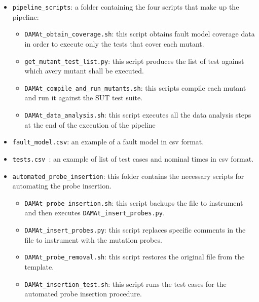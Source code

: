 \begin{itemize}
{\begin{itemize}
\begin{itemize}
\begin{itemize}
			\item \texttt{get\_operator\_coverage.py}: this script analizes the results of the operator coverage.
			\item \texttt{get\_stats.py}: this script produces statistics from the mutants' execution.
			\item \texttt{get\_final\_results.py}: this script produces a summary of the execution of \DAMA.
		\end{itemize}%
		\item \texttt{pipeline\_scripts}: a folder containing the four scripts that make up the \DAMA pipeline:
		\begin{itemize}%
			\item \texttt{DAMAt\_obtain\_coverage.sh}: this script obtains fault model coverage data in order to execute only the tests that cover each mutant.
			\item \texttt{get\_mutant\_test\_list.py}: this script produces the list of test against which avery mutant shall be executed.
			\item \texttt{DAMAt\_compile\_and\_run\_mutants.sh}: this scripts compile each mutant and run it against the SUT test suite.
			\item \texttt{DAMAt\_data\_analysis.sh}: this script executes all the data analysis steps at the end of the execution of the \DAMA pipeline
		\end{itemize}%
		\item \texttt{fault\_model.csv}: an example of a \DAMA fault model in csv format.
		\item \texttt{tests.csv }: an example of list of test cases and nominal times in csv format.
		\STARTCHANGEDFR
		\item \texttt{automated\_probe\_insertion}: this folder contains the necessary scripts for automating the probe insertion.
		\begin{itemize}
			\item \texttt{DAMAt\_probe\_insertion.sh}: this script backups the file to instrument and then executes \texttt{DAMAt\_insert\_probes.py}.
			\item \texttt{DAMAt\_insert\_probes.py}: this script replaces specific comments in the file to instrument with the mutation probes.
			\item \texttt{DAMAt\_probe\_removal.sh}: this script restores the original file from the template.
			\item \texttt{DAMAt\_insertion\_test.sh}: this script runs the test cases for the automated probe insertion procedure.

\end{itemize}
\end{itemize}
\end{itemize}}
\end{itemize}
